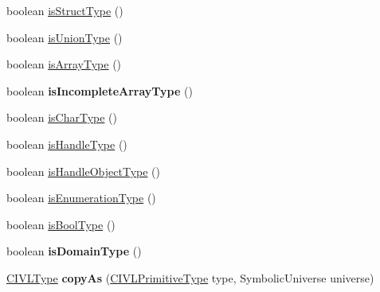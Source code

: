 \begin{DoxyCompactItemize}
boolean \hyperlink{interfaceedu_1_1udel_1_1cis_1_1vsl_1_1civl_1_1model_1_1IF_1_1type_1_1CIVLType_a548eed3201fbfb450598acecbaf85bf3}{is\+Struct\+Type} ()
\item 
boolean \hyperlink{interfaceedu_1_1udel_1_1cis_1_1vsl_1_1civl_1_1model_1_1IF_1_1type_1_1CIVLType_abd039452838e2ea50c830d0082a2611f}{is\+Union\+Type} ()
\item 
boolean \hyperlink{interfaceedu_1_1udel_1_1cis_1_1vsl_1_1civl_1_1model_1_1IF_1_1type_1_1CIVLType_ae0a3eb6030d0dca12c595d03dc4e0624}{is\+Array\+Type} ()
\item 
\hypertarget{interfaceedu_1_1udel_1_1cis_1_1vsl_1_1civl_1_1model_1_1IF_1_1type_1_1CIVLType_a00c64c7df0bc8c4f53bfb86ccec3dfe8}{}boolean {\bfseries is\+Incomplete\+Array\+Type} ()\label{interfaceedu_1_1udel_1_1cis_1_1vsl_1_1civl_1_1model_1_1IF_1_1type_1_1CIVLType_a00c64c7df0bc8c4f53bfb86ccec3dfe8}

\item 
boolean \hyperlink{interfaceedu_1_1udel_1_1cis_1_1vsl_1_1civl_1_1model_1_1IF_1_1type_1_1CIVLType_a9740f6805fc153f3163f21169b1c637d}{is\+Char\+Type} ()
\item 
boolean \hyperlink{interfaceedu_1_1udel_1_1cis_1_1vsl_1_1civl_1_1model_1_1IF_1_1type_1_1CIVLType_a1e009d99e6e769136379d471461a3396}{is\+Handle\+Type} ()
\item 
boolean \hyperlink{interfaceedu_1_1udel_1_1cis_1_1vsl_1_1civl_1_1model_1_1IF_1_1type_1_1CIVLType_ae32800c68307a47a856133fdca61bddc}{is\+Handle\+Object\+Type} ()
\item 
boolean \hyperlink{interfaceedu_1_1udel_1_1cis_1_1vsl_1_1civl_1_1model_1_1IF_1_1type_1_1CIVLType_a3b980c60c5191a2dcf66d1d6a9c66737}{is\+Enumeration\+Type} ()
\item 
boolean \hyperlink{interfaceedu_1_1udel_1_1cis_1_1vsl_1_1civl_1_1model_1_1IF_1_1type_1_1CIVLType_a159c9bb81c700a0723cd297a75681789}{is\+Bool\+Type} ()
\item 
\hypertarget{interfaceedu_1_1udel_1_1cis_1_1vsl_1_1civl_1_1model_1_1IF_1_1type_1_1CIVLType_a58b5e895cce646f7241835e11764ece0}{}boolean {\bfseries is\+Domain\+Type} ()\label{interfaceedu_1_1udel_1_1cis_1_1vsl_1_1civl_1_1model_1_1IF_1_1type_1_1CIVLType_a58b5e895cce646f7241835e11764ece0}

\item 
\hypertarget{interfaceedu_1_1udel_1_1cis_1_1vsl_1_1civl_1_1model_1_1IF_1_1type_1_1CIVLType_adf2655b0714aefa11fab54900fb75f19}{}\hyperlink{interfaceedu_1_1udel_1_1cis_1_1vsl_1_1civl_1_1model_1_1IF_1_1type_1_1CIVLType}{C\+I\+V\+L\+Type} {\bfseries copy\+As} (\hyperlink{interfaceedu_1_1udel_1_1cis_1_1vsl_1_1civl_1_1model_1_1IF_1_1type_1_1CIVLPrimitiveType}{C\+I\+V\+L\+Primitive\+Type} type, Symbolic\+Universe universe)\label{interfaceedu_1_1udel_1_1cis_1_1vsl_1_1civl_1_1model_1_1IF_1_1type_1_1CIVLType_adf2655b0714aefa11fab54900fb75f19}


\end{DoxyCompactItemize}
